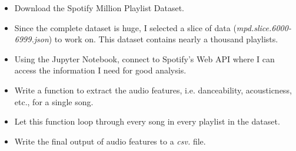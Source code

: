 \documentclass[12pt]{article}
\theoremstyle{plain}
\theoremstyle{definition}
\theoremstyle{remark}
\begin{document}
\begin{itemize}
    \item Download the Spotify Million Playlist Dataset.
    \item Since the complete dataset is huge, I selected a slice of data (\textit{mpd.slice.6000-6999.json}) to work on. This dataset contains nearly a thousand playlists.
    \item Using the Jupyter Notebook, connect to Spotify’s Web API where I can access the information I need for good analysis. 
    \item Write a function to extract the audio features, i.e. danceability, acousticness, etc., for a single song.
    \item Let this function loop through every song in every playlist in the dataset.
    \item Write the final output of audio features to a \textit{csv.} file.
\end{itemize}
\end{document}
